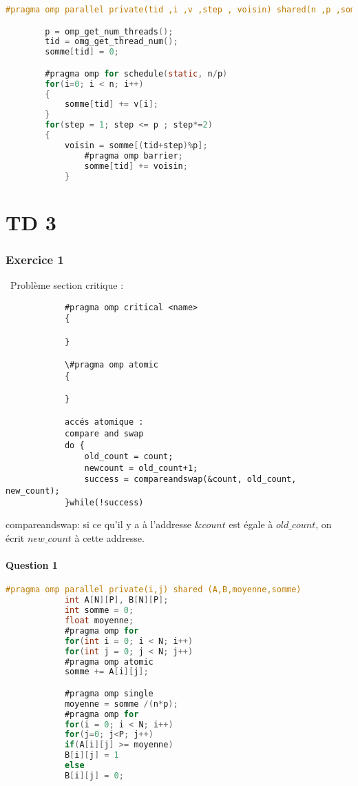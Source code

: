 \documentclass[10pt,a4paper]{article}
\begin{document}
        \begin{lstlisting}[language=C]
        #pragma omp parallel private(tid ,i ,v ,step , voisin) shared(n ,p ,somme ,globalsomme)

        p = omp_get_num_threads();
        tid = omg_get_thread_num();
        somme[tid] = 0;

        #pragma omp for schedule(static, n/p)
        for(i=0; i < n; i++)
        {
            somme[tid] += v[i];
        }
        for(step = 1; step <= p ; step*=2)
        {
            voisin = somme[(tid+step)%p];
                #pragma omp barrier;
                somme[tid] += voisin;
            }
            \end{lstlisting}

            \part*{TD 3}

            \section*{Exercice 1}

            \
            Problème section critique :
            \begin{lstlisting}
            #pragma omp critical <name>
            {

            }

            \#pragma omp atomic
            {

            }

            accés atomique :
            compare and swap
            do {
                old_count = count;
                newcount = old_count+1;
                success = compareandswap(&count, old_count, new_count);
            }while(!success)
            \end{lstlisting}

            compareandswap: si ce qu'il y a à l'addresse $\&count$ est égale à $old\_count$, on écrit $new\_count$ à cette addresse.


            \subsection*{Question 1}

            \begin{lstlisting}[language=C]
            #pragma omp parallel private(i,j) shared (A,B,moyenne,somme)
            int A[N][P], B[N][P];
            int somme = 0;
            float moyenne;
            #pragma omp for
            for(int i = 0; i < N; i++)
            for(int j = 0; j < N; j++)
            #pragma omp atomic
            somme += A[i][j];

            #pragma omp single
            moyenne = somme /(n*p);
            #pragma omp for
            for(i = 0; i < N; i++)
            for(j=0; j<P; j++)
            if(A[i][j] >= moyenne)
            B[i][j] = 1
            else
            B[i][j] = 0;

            \end{lstlisting}
\end{document}
